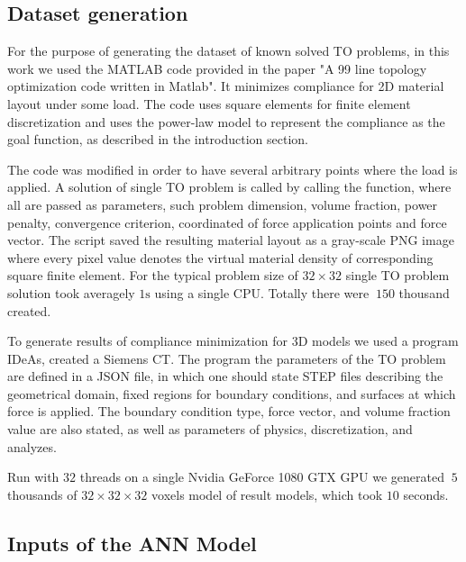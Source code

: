 \subsection{Dataset generation}

For the purpose of generating the dataset of known solved TO problems, in this work we used the MATLAB code provided in the paper "A 99 line topology optimization code written in Matlab"\cite{to_99line}.
It minimizes compliance for 2D material layout under some load.
The code uses square elements for finite element discretization and uses the power-law model to represent the compliance as the goal function, as described in the introduction section.
\medskip

The code was modified in order to have several arbitrary points where the load is applied.
A solution of single TO problem is called by calling the function, where all are passed as parameters, such problem dimension, volume fraction, power penalty, convergence criterion, coordinated of force application points and force vector. 
The script saved the resulting material layout as a gray-scale PNG image where every pixel value denotes the virtual material density of corresponding square finite element.
For the typical problem size of $ 32 \times 32 $ single TO problem solution took averagely $1 \mathrm{s}$ using a single CPU.
Totally there were $~150$ thousand created.
\medskip

To generate results of compliance minimization for 3D models we used a program IDeAs\cite{}, created a Siemens CT.
The program the parameters of the TO problem are defined in a JSON\cite{bibl:json} file, in which one should state STEP\cite{bibl:step} files describing the geometrical domain, fixed regions for boundary conditions, and surfaces at which force is applied.
The boundary condition type, force vector, and volume fraction value are also stated, as well as parameters of physics, discretization, and analyzes. 
\medskip

Run with $32$ threads on a single Nvidia GeForce 1080 GTX GPU we generated $~5$ thousands of $ 32 \times 32 \times 32$ voxels model of result models, which took $10$ seconds.
\medskip 



\subsection{Inputs of the ANN Model}

